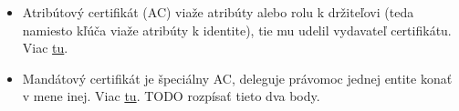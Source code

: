 \documentclass[12pt,a4paper]{article}
\begin{document}
{\begin{itemize}
\begin{figure}[htbp]
\begin{subfigure}[b]{0.48\textwidth}
                \label{fig:root}
            \end{subfigure}        
            \caption{Architektúry PKI.}
            \label{fig:main}
        \end{figure}
        \item Atribútový certifikát (AC) viaže atribúty alebo rolu k držiteľovi (teda namiesto kľúča viaže atribúty k identite), tie mu udelil vydavateľ certifikátu. Viac \href{https://en.wikipedia.org/wiki/Authorization_certificate}{tu}.
        \item Mandátový certifikát je špeciálny AC, deleguje právomoc jednej entite konať v mene inej. Viac \href{https://snca.gov.sk/kvalifikovane-sluzby/mandatny-certifikat}{tu}. TODO rozpísať tieto dva body.
    \end{itemize}
    
}
\end{document}
